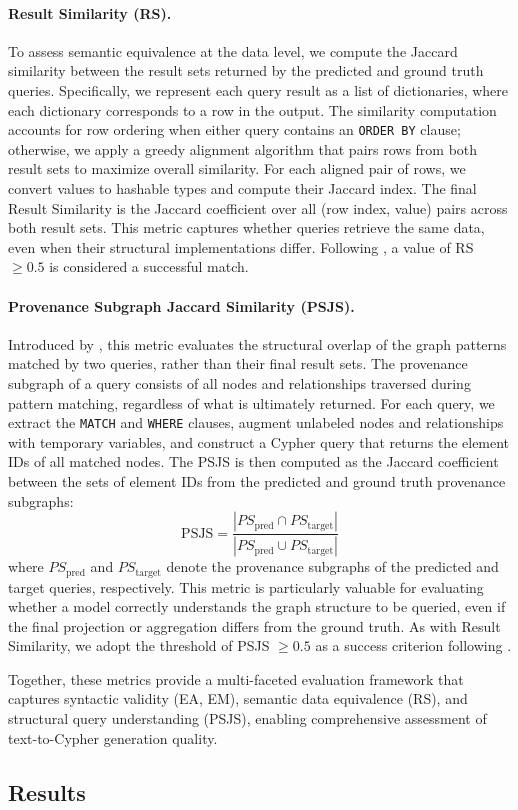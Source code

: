 \paragraph{Result Similarity (RS).} To assess semantic equivalence at the data level, we compute the Jaccard similarity between the result sets returned by the predicted and ground truth queries. Specifically, we represent each query result as a list of dictionaries, where each dictionary corresponds to a row in the output. The similarity computation accounts for row ordering when either query contains an \texttt{ORDER BY} clause; otherwise, we apply a greedy alignment algorithm that pairs rows from both result sets to maximize overall similarity. For each aligned pair of rows, we convert values to hashable types and compute their Jaccard index. The final Result Similarity is the Jaccard coefficient over all (row index, value) pairs across both result sets. This metric captures whether queries retrieve the same data, even when their structural implementations differ. Following \cite{neo4jlabs-text2cypher-2024}, a value of RS $\geq 0.5$ is considered a successful match.

\paragraph{Provenance Subgraph Jaccard Similarity (PSJS).} Introduced by \cite{cypherbench-megagonlabs-2024}, this metric evaluates the structural overlap of the graph patterns matched by two queries, rather than their final result sets. The provenance subgraph of a query consists of all nodes and relationships traversed during pattern matching, regardless of what is ultimately returned. For each query, we extract the \texttt{MATCH} and \texttt{WHERE} clauses, augment unlabeled nodes and relationships with temporary variables, and construct a Cypher query that returns the element IDs of all matched nodes. The PSJS is then computed as the Jaccard coefficient between the sets of element IDs from the predicted and ground truth provenance subgraphs:
\[
\text{PSJS} = \frac{|PS_{\text{pred}} \cap PS_{\text{target}}|}{|PS_{\text{pred}} \cup PS_{\text{target}}|}
\]
where $PS_{\text{pred}}$ and $PS_{\text{target}}$ denote the provenance subgraphs of the predicted and target queries, respectively. This metric is particularly valuable for evaluating whether a model correctly understands the graph structure to be queried, even if the final projection or aggregation differs from the ground truth. As with Result Similarity, we adopt the threshold of PSJS $\geq 0.5$ as a success criterion following \cite{cypherbench-megagonlabs-2024}.

Together, these metrics provide a multi-faceted evaluation framework that captures syntactic validity (EA, EM), semantic data equivalence (RS), and structural query understanding (PSJS), enabling comprehensive assessment of text-to-Cypher generation quality.

\subsection{Results}